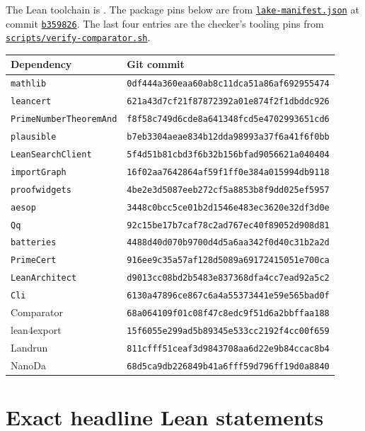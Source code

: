 \documentclass[11pt]{amsart}
\theoremstyle{definition}
\theoremstyle{remark}
\numberwithin{equation}{section}
\newcommand{\repositoryurl}{https://github.com/kimihiro64/Robin1984}
\newcommand{\proofrevision}{b359826e62c50b6cef55db4b2fcab793232498cc}
\newcommand{\codefile}[1]{%
  \href{\repositoryurl/blob/\proofrevision/#1}{\nolinkurl{#1}}}
\newcommand{\commitlink}[2]{%
  \href{\repositoryurl/commit/#1}{\texttt{#2}}}
\begin{document}
The Lean toolchain is .
The package pins below are from \codefile{lake-manifest.json}
at commit \commitlink{\proofrevision}{b359826}.
The last four entries are the checker's tooling pins from
\codefile{scripts/verify-comparator.sh}.

\begingroup\small
\begin{longtable}{@{}lp{}@{}}
\toprule
Dependency & Git commit\\
\midrule
\endhead
\texttt{mathlib} & \texttt{0df444a360eaa60ab8c11dca51a86af692955474}\\
\texttt{leancert} & \texttt{621a43d7cf21f87872392a01e874f2f1dbddc926}\\
\texttt{PrimeNumberTheoremAnd} & \texttt{f8f58c749d6cde8a641348fcd5e4702993651cd6}\\
\texttt{plausible} & \texttt{b7eb3304aeae834b12dda98993a37f6a41f6f0bb}\\
\texttt{LeanSearchClient} & \texttt{5f4d51b81cbd3f6b32b156bfad9056621a040404}\\
\texttt{importGraph} & \texttt{16f02aa7642864af59f1ff0e384a015994db9118}\\
\texttt{proofwidgets} & \texttt{4be2e3d5087eeb272cf5a8853b8f9dd025ef5957}\\
\texttt{aesop} & \texttt{3448c0bcc5ce01b2d1546e483ec3620e32df3d0e}\\
\texttt{Qq} & \texttt{92c15be17b7caf78c2ad767ec40f89052d908d81}\\
\texttt{batteries} & \texttt{4488d40d070b9700d4d5a6aa342f0d40c31b2a2d}\\
\texttt{PrimeCert} & \texttt{916ee9c35a57af128d5089a69172415051e700ca}\\
\texttt{LeanArchitect} & \texttt{d9013cc08bd2b5483e837368dfa4cc7ead92a5c2}\\
\texttt{Cli} & \texttt{6130a47896ce867c6a4a55373441e59e565bad0f}\\
\midrule
Comparator & \texttt{68a064109f01c08f47c8edc9f51d6a2bbffaa188}\\
lean4export & \texttt{15f6055e299ad5b89345e533cc2192f4cc00f659}\\
Landrun & \texttt{811cfff51ceaf3d9843708aa6d22e9b84ccac8b4}\\
NanoDa & \texttt{68d5ca9db226849b41a6fff59d796ff19d0a8840}\\
\bottomrule
\end{longtable}
\endgroup

\section{Exact headline Lean statements}\label{app:exact-lean}
\end{document}
